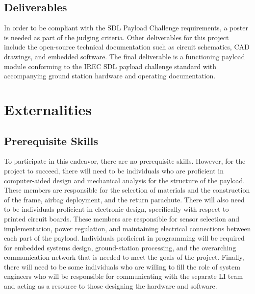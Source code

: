 \documentclass[conference]{IEEEtran} %
\begin{document}
\subsection{Deliverables}
\label{subsec:Deliverables}
In order to be compliant with the SDL Payload Challenge requirements, a poster is needed as part of the judging criteria.
Other deliverables for this project include the open-source technical documentation such as circuit schematics, CAD drawings,
and embedded software. The final deliverable is a functioning payload module conforming to the IREC SDL payload challenge
standard with accompanying ground station hardware and operating documentation.

\section{Externalities}
\label{subsec:Externalities}
\subsection{Prerequisite Skills}
\label{subsec:Prerequisite Skills}
To participate in this endeavor, there are no prerequisite skills. However, for the project to succeed, there will need to be
individuals who are proficient in computer-aided design and mechanical analysis for the structure of the payload. These members
are responsible for the selection of materials and the construction of the frame, airbag deployment, and the return parachute.
There will also need to be individuals proficient in electronic design, specifically with respect to printed circuit boards.
These members are responsible for sensor selection and implementation, power regulation, and maintaining electrical connections
between each part of the payload. Individuals proficient in programming will be required for embedded systems design, ground-station processing,
and the overarching communication network that is needed to meet the goals of the project.  Finally, there will need to be some individuals
who are willing to fill the role of system engineers who will be responsible for communicating with the separate LI team and acting as a resource
to those designing the hardware and software.
\end{document}
